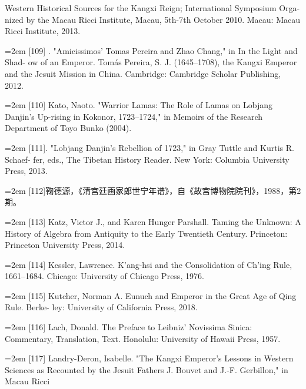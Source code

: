 \space%
Western Historical Sources for the Kangxi Reign; International Symposium Orga-%
nized by the Macau Ricci Institute, Macau, 5th-7th October 2010. Macau: Macau%
\space%
Ricci Institute, 2013.%
\par
\noindent\hangindent=2em
[109] . "Amicissimos' Tomas Pereira and Zhao Chang," in In the Light and Shad-%
ow of an Emperor. Tomás Pereira, S. J. (1645–1708), the Kangxi Emperor and the%
\space%
Jesuit Mission in China. Cambridge: Cambridge Scholar Publishing, 2012.%
\par
\noindent\hangindent=2em
[110] Kato, Naoto. "Warrior Lamas: The Role of Lamas on Lobjang Danjin's Up-rising%
\space%
in Kokonor, 1723–1724," in Memoirs of the Research Department of Toyo Bunko%
 (2004).%
\par
\noindent\hangindent=2em
[111]. "Lobjang Danjin's Rebellion of 1723," in Gray Tuttle and Kurtis R. Schaef-%
fer, eds., The Tibetan History Reader. New York: Columbia University Press, 2013.%
\par
\noindent\hangindent=2em
[112]鞠德源，《清宫廷画家郎世宁年谱》，自《故宫博物院院刊》，1988，第2期。%
\par
\noindent\hangindent=2em
[113] Katz, Victor J., and Karen Hunger Parshall. Taming the Unknown: A History%
\space%
of Algebra from Antiquity to the Early Twentieth Century. Princeton: Princeton%
\space%
University Press, 2014.%
\par
\noindent\hangindent=2em
[114] Kessler, Lawrence. K'ang-hsi and the Consolidation of Ch'ing Rule, 1661–1684.%
\space%
Chicago: University of Chicago Press, 1976.%
\par
\noindent\hangindent=2em
[115] Kutcher, Norman A. Eunuch and Emperor in the Great Age of Qing Rule. Berke-%
ley: University of California Press, 2018.%
\par
\noindent\hangindent=2em
[116] Lach, Donald. The Preface to Leibniz' Novissima Sinica: Commentary, Translation,%
\space%
Text. Honolulu: University of Hawaii Press, 1957.%
\par
\noindent\hangindent=2em
[117] Landry-Deron, Isabelle. "The Kangxi Emperor's Lessons in Western Sciences as%
\space%
Recounted by the Jesuit Fathers J. Bouvet and J.-F. Gerbillon," in Macau Ricci%
\space%
